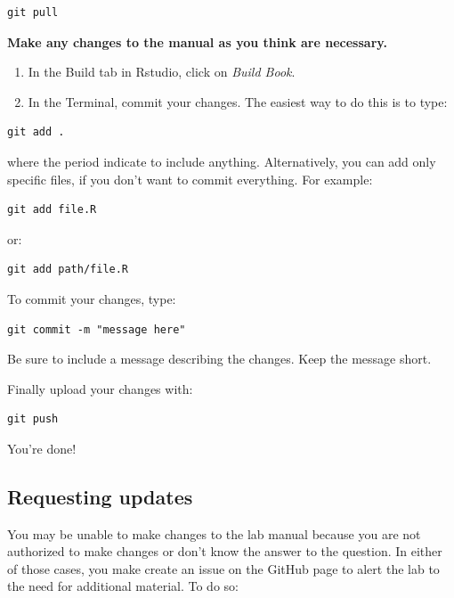 \documentclass[]{book}
\providecommand{\tightlist}{%
  \setlength{\itemsep}{0pt}\setlength{\parskip}{0pt}}
\begin{document}
\begin{verbatim}
git pull
\end{verbatim}

\textbf{Make any changes to the manual as you think are necessary.}

\begin{enumerate}
\def\labelenumi{\arabic{enumi}.}
\setcounter{enumi}{2}
\tightlist
\item
  In the Build tab in Rstudio, click on \emph{Build Book}.
\item
  In the Terminal, commit your changes. The easiest way to do this is to type:
\end{enumerate}

\begin{verbatim}
git add .
\end{verbatim}

where the period indicate to include anything. Alternatively, you can add only specific files, if you don't want to commit everything. For example:

\begin{verbatim}
git add file.R
\end{verbatim}

or:

\begin{verbatim}
git add path/file.R
\end{verbatim}

To commit your changes, type:

\begin{verbatim}
git commit -m "message here"
\end{verbatim}

Be sure to include a message describing the changes. Keep the message short.

Finally upload your changes with:

\begin{verbatim}
git push
\end{verbatim}

You're done!

\hypertarget{requesting-updates}{%
\subsection{Requesting updates}\label{requesting-updates}}

You may be unable to make changes to the lab manual because you are not authorized to make changes or don't know the answer to the question. In either of those cases, you make create an issue on the GitHub page to alert the lab to the need for additional material. To do so:
\end{document}
